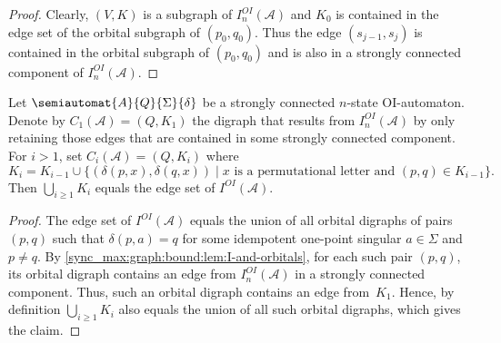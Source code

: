 \begin{proof}
	Clearly, $(V,K)$
	is a subgraph of $I_n^{OI}(\mathcal A)$
	and $K_0$ is contained in the edge set of the orbital subgraph
	of $(p_0, q_0)$.
	Thus the edge $(s_{j-1}, s_j)$ is contained in the orbital subgraph of $(p_0, q_0)$
	and is also in a strongly connected component of $I_n^{OI}(\mathcal A)$.	
\end{proof}

\begin{corollary} \label{sync_max:graph:bound:cor:I-and-orbitals}
	Let $\semiautomat{A}{Q}{\Sigma}{\delta}$
	be a strongly connected $n$-state OI-automaton.
	Denote by $C_1(\mathcal A) = (Q, K_1)$
	the digraph that results from $I_n^{OI}(\mathcal A)$
	by only retaining those edges that are contained 
	in some strongly connected component. %
	For $i > 1$, set $C_i(\mathcal A) = (Q, K_i)$
	where 
	\[
	K_i = K_{i-1} \cup \{ (\delta(p, x), \delta(q, x)) \mid x \text{ is a permutational letter and } (p,q) \in K_{i-1} \}.
	\]
	Then $\bigcup_{i \ge 1} K_i$ equals the edge set of $I^{OI}(\mathcal A)$.
\end{corollary}
\begin{proof}
	The edge set of $I^{OI}(\mathcal A)$
	equals the union of all orbital digraphs
	of pairs $(p,q)$ such that $\delta(p, a) = q$
	for some idempotent one-point singular $a \in \Sigma$
	and $p \ne q$.
	By \cref{sync_max:graph:bound:lem:I-and-orbitals},
	for each such pair $(p,q)$, its orbital digraph
	contains an edge from $I_n^{OI}(\mathcal A)$ in a strongly connected component.
	Thus, such an orbital digraph contains an edge from~$K_1$.
	Hence, by definition $\bigcup_{i \ge 1} K_i$
	also equals the union of all such orbital digraphs,	which gives the claim.
\end{proof}

